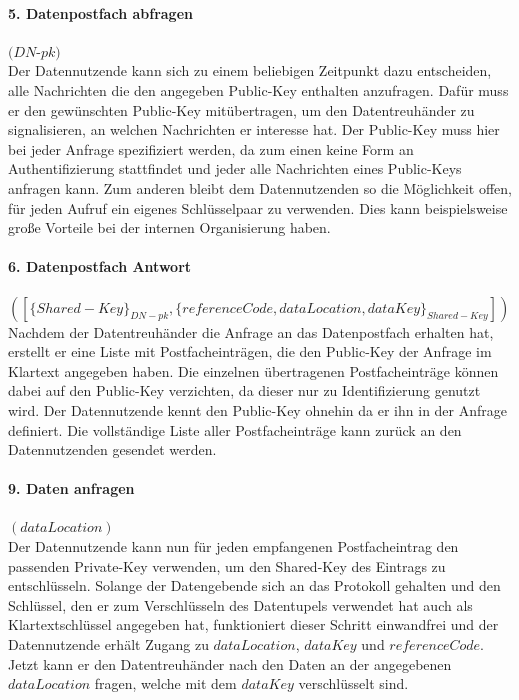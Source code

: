 \documentclass{scrreprt}
\begin{document}
\paragraph{5. Datenpostfach abfragen} $(DN$-$pk)$\\
Der Datennutzende kann sich zu einem beliebigen Zeitpunkt dazu entscheiden, alle Nachrichten die den angegeben Public-Key enthalten anzufragen. Dafür muss er den gewünschten Public-Key mitübertragen, um den Datentreuhänder zu signalisieren, an welchen Nachrichten er interesse hat. Der Public-Key muss hier bei jeder Anfrage spezifiziert werden, da zum einen keine Form an Authentifizierung stattfindet und jeder alle Nachrichten eines Public-Keys anfragen kann. Zum anderen bleibt dem Datennutzenden so die Möglichkeit offen, für jeden Aufruf ein eigenes Schlüsselpaar zu verwenden. Dies kann beispielsweise große Vorteile bei der internen Organisierung haben.

\paragraph{6. Datenpostfach Antwort} $([\{Shared-Key\}_{DN-pk}, \{referenceCode, dataLocation, dataKey\}_{Shared-Key}])$\\
Nachdem der Datentreuhänder die Anfrage an das Datenpostfach erhalten hat, erstellt er eine Liste mit Postfacheinträgen, die den Public-Key der Anfrage im Klartext angegeben haben. Die einzelnen übertragenen Postfacheinträge können dabei auf den Public-Key verzichten, da dieser nur zu Identifizierung genutzt wird. Der Datennutzende kennt den Public-Key ohnehin da er ihn in der Anfrage definiert. Die vollständige Liste aller Postfacheinträge kann zurück an den Datennutzenden gesendet werden.

\paragraph{9. Daten anfragen} $(dataLocation)$\\
Der Datennutzende kann nun für jeden empfangenen Postfacheintrag den passenden Private-Key verwenden, um den Shared-Key des Eintrags zu entschlüsseln. Solange der Datengebende sich an das Protokoll gehalten und den Schlüssel, den er zum Verschlüsseln des Datentupels verwendet hat auch als Klartextschlüssel angegeben hat, funktioniert dieser Schritt einwandfrei und der Datennutzende erhält Zugang zu $dataLocation$, $dataKey$ und $referenceCode$. Jetzt kann er den Datentreuhänder nach den Daten an der angegebenen $dataLocation$ fragen, welche mit dem $dataKey$ verschlüsselt sind.
\end{document}
